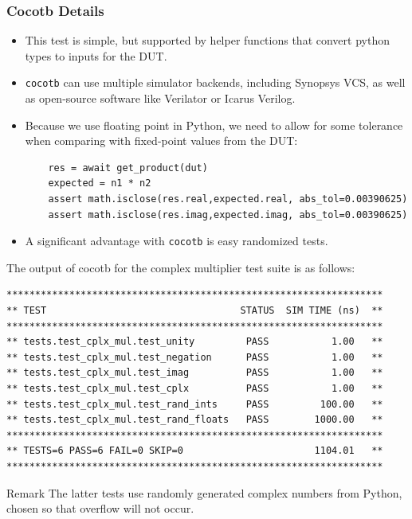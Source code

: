 \documentclass{beamer}
\begin{document}
\begin{frame}[fragile]
	\frametitle{Cocotb Details}
	\begin{itemize}
\item This test is simple, but supported by helper functions
	that convert python types to inputs for the DUT.
\item \texttt{cocotb} can use multiple simulator backends, including Synopsys VCS,
	as well as open-source software like Verilator or Icarus Verilog.

\item	Because we use floating point in Python, we need to allow for some tolerance
	when comparing with fixed-point values from the DUT:
\begin{verbatim}
    res = await get_product(dut)
    expected = n1 * n2
    assert math.isclose(res.real,expected.real, abs_tol=0.00390625)
    assert math.isclose(res.imag,expected.imag, abs_tol=0.00390625)
\end{verbatim}

\item A significant advantage with \texttt{cocotb} is easy randomized tests.


\end{itemize}

\end{frame}

\begin{frame}[fragile]

The output of cocotb for the complex multiplier test suite is as follows:
\begin{verbatim}
******************************************************************
** TEST                                  STATUS  SIM TIME (ns)  **
******************************************************************
** tests.test_cplx_mul.test_unity         PASS           1.00   **
** tests.test_cplx_mul.test_negation      PASS           1.00   **
** tests.test_cplx_mul.test_imag          PASS           1.00   **
** tests.test_cplx_mul.test_cplx          PASS           1.00   **
** tests.test_cplx_mul.test_rand_ints     PASS         100.00   **
** tests.test_cplx_mul.test_rand_floats   PASS        1000.00   **
******************************************************************
** TESTS=6 PASS=6 FAIL=0 SKIP=0                       1104.01   **
******************************************************************
\end{verbatim}

\begin{block}{Remark}
	The latter tests use randomly generated complex numbers from Python, chosen
	so that overflow will not occur.
\end{block}
\end{frame}
\end{document}
